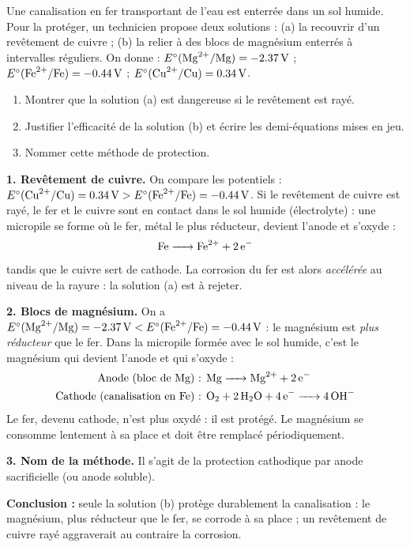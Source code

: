 \documentclass[11pt]{article}
\newcommand{\cle}[1]{{\popxbold\color{popdark}#1}}
\begin{document}
\begin{exoresolu}
Une canalisation en fer transportant de l'eau est enterrée dans un sol humide. Pour la protéger, un technicien propose deux solutions : (a) la recouvrir d'un revêtement de cuivre ; (b) la relier à des blocs de magnésium enterrés à intervalles réguliers. On donne : $E^{\circ}(\ce{Mg^2+}/\ce{Mg}) = \SI{-2,37}{V}$ ; $E^{\circ}(\ce{Fe^2+}/\ce{Fe}) = \SI{-0,44}{V}$ ; $E^{\circ}(\ce{Cu^2+}/\ce{Cu}) = \SI{+0,34}{V}$.
\begin{enumerate}
\item Montrer que la solution (a) est dangereuse si le revêtement est rayé.
\item Justifier l'efficacité de la solution (b) et écrire les demi-équations mises en jeu.
\item Nommer cette méthode de protection.
\end{enumerate}
\tcblower
\textbf{1. Revêtement de cuivre.} On compare les potentiels : $E^{\circ}(\ce{Cu^2+}/\ce{Cu}) = \SI{+0,34}{V} > E^{\circ}(\ce{Fe^2+}/\ce{Fe}) = \SI{-0,44}{V}$. Si le revêtement de cuivre est rayé, le fer et le cuivre sont en contact dans le sol humide (électrolyte) : une micropile se forme où le \cle{fer}, métal le plus réducteur, devient l'\cle{anode} et s'oxyde :
\[ \ce{Fe -> Fe^2+ + 2e-} \]
tandis que le cuivre sert de cathode. La corrosion du fer est alors \emph{accélérée} au niveau de la rayure : la solution (a) est à rejeter.

\textbf{2. Blocs de magnésium.} On a $E^{\circ}(\ce{Mg^2+}/\ce{Mg}) = \SI{-2,37}{V} < E^{\circ}(\ce{Fe^2+}/\ce{Fe}) = \SI{-0,44}{V}$ : le magnésium est \emph{plus réducteur} que le fer. Dans la micropile formée avec le sol humide, c'est le magnésium qui devient l'anode et qui s'oxyde :
\begin{align*}
\text{Anode (bloc de Mg) : } & \ce{Mg -> Mg^2+ + 2e-}\\
\text{Cathode (canalisation en Fe) : } & \ce{O2 + 2H2O + 4e- -> 4OH-}
\end{align*}
Le fer, devenu cathode, n'est plus oxydé : il est protégé. Le magnésium se consomme lentement à sa place et doit être remplacé périodiquement.

\textbf{3. Nom de la méthode.} Il s'agit de la \cle{protection cathodique} par \cle{anode sacrificielle} (ou anode soluble).

\textbf{Conclusion :} seule la solution (b) protège durablement la canalisation : le magnésium, plus réducteur que le fer, se corrode à sa place ; un revêtement de cuivre rayé aggraverait au contraire la corrosion.
\end{exoresolu}
\end{document}
